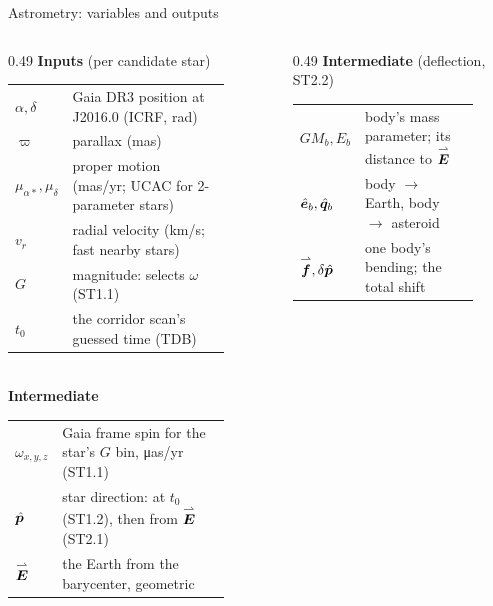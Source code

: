 \begin{frame}{Astrometry: variables and outputs}
  \scriptsize
  \renewcommand{\arraystretch}{1.02}
  \begin{columns}[T]
    \begin{column}{0.49\textwidth}
      \textbf{Inputs} (per candidate star)\\[0.3ex]
      \begin{tabular}{@{}l >{\raggedright\arraybackslash}p{0.82\linewidth}@{}}
        $\alpha, \delta$ & Gaia DR3 position at J2016.0 (ICRF, rad) \\
        $\varpi$ & parallax (mas) \\
        $\mu_{\alpha*}, \mu_\delta$ & proper motion (mas/yr; UCAC for 2-parameter stars) \\
        $v_r$ & radial velocity (km/s; fast nearby stars) \\
        $G$ & magnitude: selects $\omega$ (ST1.1) \\
        $t_0$ & the corridor scan's guessed time (TDB) \\
      \end{tabular}\\[0.6ex]
      \textbf{Intermediate}\\[0.3ex]
      \begin{tabular}{@{}l >{\raggedright\arraybackslash}p{0.82\linewidth}@{}}
        $\omega_{x,y,z}$ & Gaia frame spin for the star's $G$ bin, \si{\micro as/yr} (ST1.1) \\
        $\hat{\bm{p}}$ & star direction: at $t_0$ (ST1.2), then from $\overset{\rightharpoonup}{\bm{E}}$ (ST2.1) \\
        $\overset{\rightharpoonup}{\bm{E}}$ & the Earth from the barycenter, geometric \\
      \end{tabular}
    \end{column}
    \begin{column}{0.49\textwidth}
      \textbf{Intermediate} (deflection, ST2.2)\\[0.3ex]
      \begin{tabular}{@{}l >{\raggedright\arraybackslash}p{0.82\linewidth}@{}}
        $GM_b, E_b$ & body's mass parameter; its distance to $\overset{\rightharpoonup}{\bm{E}}$ \\
        $\hat{\bm{e}}_b, \hat{\bm{q}}_b$ & body $\to$ Earth, body $\to$ asteroid \\
        $\overset{\rightharpoonup}{\bm{f}}, \delta\hat{\bm{p}}$ & one body's bending; the total shift \\

\end{tabular}
\end{column}
\end{columns}
\end{frame}
